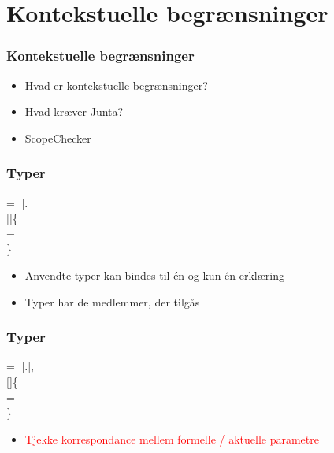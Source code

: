 \section{Kontekstuelle begrænsninger}

\begin{frame}
\frametitle{Kontekstuelle begrænsninger}
\begin{center}
\begin{itemize}
\item Hvad er kontekstuelle begrænsninger?
\item Hvad kræver Junta?
\item ScopeChecker
\end{itemize}
\end{center}
\end{frame}


\begin{frame}[fragile]
\frametitle{Typer}

  = []. \\
 []\{ \\
  \quad  {}  =  \\
\}

\begin{itemize}                                  
\item Anvendte typer kan bindes til én og kun én erklæring
\item Typer har de medlemmer, der tilgås
\end{itemize}
\end{frame}

\begin{frame}[fragile]

\end{frame}

\begin{frame}[fragile]
\frametitle{Typer}

  = [].[,
] \\
 []\{ \\
  \quad  {}  =  \\
\}

\begin{itemize}                                  
\item \textcolor{red}{Tjekke korrespondance mellem formelle / aktuelle parametre}
\end{itemize}

\end{frame}

